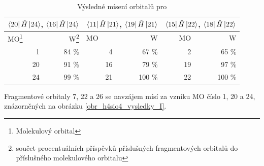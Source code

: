 \documentclass[
  digital, %
  table,   %
  lof,     %
  lot,     %
]{fithesis3}
\begin{document}
\begin{table}[htbp]
\begin{minipage}{\textwidth}
\caption{Výsledné mísení orbitalů pro }
\begin{center}
\begin{tabular}{|r|r|r|r|r|r|}
\hline 
\multicolumn{2}{|c|}{$\bra{20}{\hat{H}}\ket{24}$, $\bra{16}{\hat{H}}\ket{24}$} & \multicolumn{2}{|c|}{$\bra{11}{\hat{H}}\ket{21}$, $\bra{19}{\hat{H}}\ket{21}$}& \multicolumn{2}{|c|}{$\bra{15}{\hat{H}}\ket{22}$, $\bra{18}{\hat{H}}\ket{22}$} \\
\hline \hline
\multicolumn{1}{|l|}{MO\footnote{Molekulový orbital} } & \multicolumn{1}{r|}{W\footnote{součet procentuálních příspěvků příslušných fragmentových orbitalů do příslušného molekulového orbitalu}} & \multicolumn{1}{l|}{MO} & \multicolumn{1}{r|}{W} & MO & \multicolumn{1}{r|}{W} \\ \hline
1 & 84 \% & 4 & 67 \% & 2 & 65 \% \\ \hline
20 & 91 \% & 16 & 79 \% & 19 &  97 \% \\ \hline
24 & 99 \% & 21 & 100 \% &  22& 100 \% \\ \hline
\end{tabular}
\end{center}
\label{tab_h4sio4_vysledky}
\end{minipage}
\end{table}
    Fragmentové orbitaly 7, 22 a 26 se navzájem mísí za vzniku MO číslo 1, 20 a 24, znázorněných na obrázku \ref{obr_h4sio4_vysledky_I}.
\end{document}
